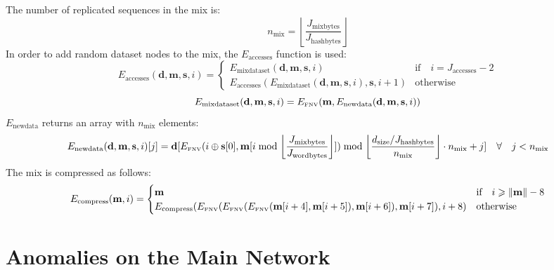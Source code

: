 \documentclass[9pt,oneside]{amsart}
\begin{document}
The number of replicated sequences in the mix is:
\begin{equation}
 n_{\mathrm{mix}} =  \left\lfloor\frac{J_{\mathrm{mixbytes}}}{J_{\mathrm{hashbytes}}}\right\rfloor
\end{equation}
In order to add random dataset nodes to the mix, the $E_{\mathrm{accesses}}$ function is used:
\begin{equation}
 E_{\mathrm{accesses}}(\mathbf{d}, \mathbf{m}, \mathbf{s}, i) = \begin{cases}
E_{\mathrm{mixdataset}}(\mathbf{d}, \mathbf{m},  \mathbf{s}, i) & \text{if} \quad i = J_{\mathrm{accesses}} -2 \\
E_{\mathrm{accesses}}(E_{\mathrm{mixdataset}}(\mathbf{d}, \mathbf{m}, \mathbf{s}, i), \mathbf{s}, i + 1) & \text{otherwise}
\end{cases}
\end{equation}
\begin{equation}
 E_{\mathrm{mixdataset}}(\mathbf{d}, \mathbf{m}, \mathbf{s}, i) = E_\text{\tiny FNV}(\mathbf{m}, E_{\mathrm{newdata}}(\mathbf{d}, \mathbf{m}, \mathbf{s}, i))
\end{equation}
$E_{\mathrm{newdata}}$ returns an array with $n_{\mathrm{mix}}$ elements:
\begin{equation}
 E_{\mathrm{newdata}}(\mathbf{d}, \mathbf{m}, \mathbf{s}, i)[j] = \mathbf{d}[E_\text{\tiny FNV}(i \oplus \mathbf{s}[0], \mathbf{m}[i \bmod \left\lfloor\frac{J_{\mathrm{mixbytes}}}{J_{\mathrm{wordbytes}}}\right\rfloor]) \bmod \left\lfloor\frac{d_{\mathrm{size}} / J_{\mathrm{hashbytes}}}{n_{\mathrm{mix}}}\right\rfloor \cdot n_{\mathrm{mix}} + j] \quad \forall \quad j < n_{\mathrm{mix}}
\end{equation}
The mix is compressed as follows:
\begin{equation}
 E_{\mathrm{compress}}(\mathbf{m}, i) = \begin{cases}
\mathbf{m} & \text{if} \quad i \geqslant \lVert \mathbf{m} \rVert - 8 \\
E_{\mathrm{compress}}(E_\text{\tiny FNV}(E_\text{\tiny FNV}(E_\text{\tiny FNV}(\mathbf{m}[i + 4], \mathbf{m}[i + 5]), \mathbf{m}[i + 6]), \mathbf{m}[i + 7]), i + 8) & \text{otherwise}
\end{cases}
\end{equation}

\section{Anomalies on the Main Network}
\end{document}
